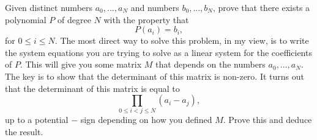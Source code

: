   \begin{exercise}
    Given distinct numbers $a_0,...,a_N$ and numbers $b_0,...,b_N$, prove that there exists a polynomial $P$ of degree $N$ with the property that
    \begin{equation}
      P(a_i) = b_i,
    \end{equation}
    for $0 \leq i \leq N$. The most direct way to solve this problem, in my view, is to write the system equations you are trying to solve as a linear system for the coefficients of $P$. This will give you some matrix $M$ that depends on the numbers $a_0,...,a_N$. The key is to show that the determinant of this matrix is non-zero. It turns out that the determinant of this matrix is equal to
    \begin{equation}
      \prod_{0\leq i<j\leq N}(a_i - a_j),
    \end{equation}
    up to a potential $-$ sign depending on how you defined $M$. Prove this and deduce the result.
  \end{exercise}
